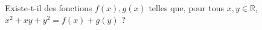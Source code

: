 Existe-t-il des fonctions $f(x), g(x)$ telles que, pour tous $x, y \in \mathbb{R}$, $x^2 + xy + y^2 = f(x) + g(y)$ ?
